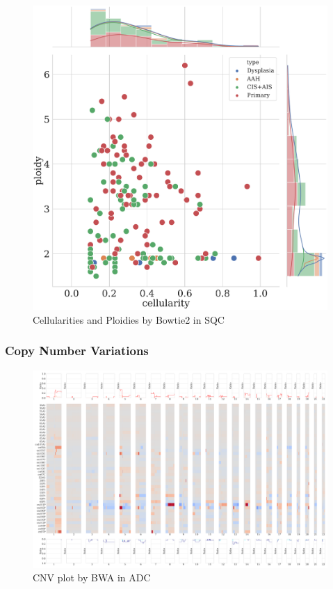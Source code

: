 \documentclass[11pt,a4paper,onecolumn,oneside]{report}
\begin{document}
                \begin{figure}[p]
                    \centering
                    \includegraphics[width=0.6 \linewidth]{figures/Sequenza/Bowtie2-sequenza-SQC.pdf}
                    \caption{Cellularities and Ploidies by Bowtie2 in SQC}
                    \label{fig:sequenza-Bowtie2-SQC}
                \end{figure}

            \subsubsection{Copy Number Variations}
                \begin{figure}[p]
                    \centering
                    \includegraphics[width=\linewidth]{figures/Sequenza/BWA-genome-ADC.pdf}
                    \caption{CNV plot by BWA in ADC}
                    \label{fig:CNV-BWA-ADC}
                \end{figure}
\end{document}
